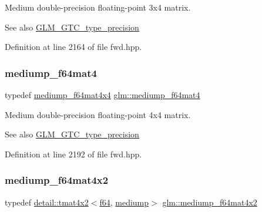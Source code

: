Medium double-\/precision floating-\/point 3x4 matrix. \begin{DoxySeeAlso}{See also}
\hyperlink{group__gtc__type__precision}{G\+L\+M\+\_\+\+G\+T\+C\+\_\+type\+\_\+precision} 
\end{DoxySeeAlso}


Definition at line 2164 of file fwd.\+hpp.

\mbox{\label{group__gtc__type__precision_ga2763f655bfe2141a014e66d26a9d2f18}} 
\subsubsection{\texorpdfstring{mediump\+\_\+f64mat4}{mediump\_f64mat4}}
{\footnotesize\ttfamily typedef \hyperlink{group__gtc__type__precision_ga941e42a0b337b5c8ad9c324aaa6b2ad5}{mediump\+\_\+f64mat4x4} \hyperlink{group__gtc__type__precision_ga2763f655bfe2141a014e66d26a9d2f18}{glm\+::mediump\+\_\+f64mat4}}

Medium double-\/precision floating-\/point 4x4 matrix. \begin{DoxySeeAlso}{See also}
\hyperlink{group__gtc__type__precision}{G\+L\+M\+\_\+\+G\+T\+C\+\_\+type\+\_\+precision} 
\end{DoxySeeAlso}


Definition at line 2192 of file fwd.\+hpp.

\mbox{\label{group__gtc__type__precision_ga4a7a2b6889f08c9209a4f994fd87cc4e}} 
\subsubsection{\texorpdfstring{mediump\+\_\+f64mat4x2}{mediump\_f64mat4x2}}
{\footnotesize\ttfamily typedef \hyperlink{structglm_1_1detail_1_1tmat4x2}{detail\+::tmat4x2}$<$\hyperlink{group__gtc__type__precision_ga2bba392e555124b36cde6abba349bab3}{f64}, \hyperlink{namespaceglm_a0f04f086094c747d227af4425893f545a6416f3ea0c9025fb21ed50c4d6620482}{mediump}$>$ \hyperlink{group__gtc__type__precision_ga4a7a2b6889f08c9209a4f994fd87cc4e}{glm\+::mediump\+\_\+f64mat4x2}}

